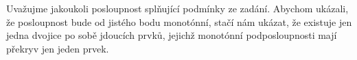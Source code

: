 \documentclass{fkssolpub}
\author{Ondřej Sedláček}
\begin{document}
Uvažujme jakoukoli posloupnost splňující podmínky ze zadání. Abychom
ukázali, že posloupnost bude od jistého bodu monotónní, stačí
nám ukázat, že existuje jen jedna dvojice po sobě jdoucích prvků,
jejichž monotónní podposloupnosti mají překryv jen jeden prvek.
\end{document}
